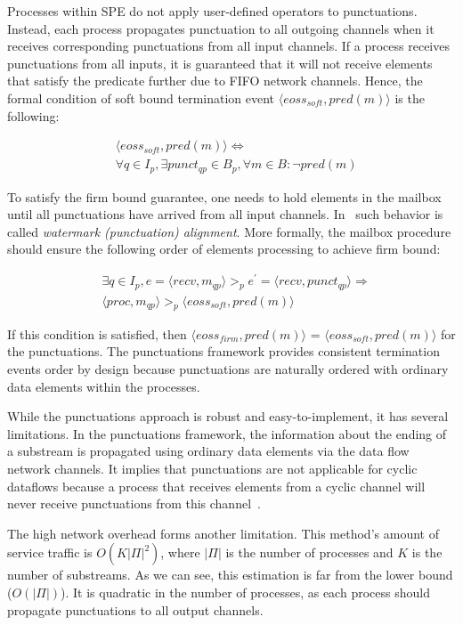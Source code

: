 Processes within SPE do not apply user-defined operators to punctuations. Instead, each process propagates punctuation to all outgoing channels when it receives corresponding punctuations from all input channels. If a process receives punctuations from all inputs, it is guaranteed that it will not receive elements that satisfy the predicate further due to FIFO network channels. Hence, the formal condition of soft bound termination event $\langle eoss_{soft}, pred(m)\rangle$ is the following:

\begin{align*}
& \langle eoss_{soft}, pred(m)\rangle \Longleftrightarrow \\ 
& \forall q \in I_p, \exists punct_{qp} \in B_p, \forall m\in B : \neg pred(m)
\end{align*}

To satisfy the firm bound guarantee, one needs to hold elements in the mailbox until all punctuations have arrived from all input channels. In~\cite{Carbone:2017:SMA:3137765.3137777} such behavior is called {\em watermark (punctuation) alignment}. More formally, the mailbox procedure should ensure the following order of elements processing to achieve firm bound:

\begin{align*}
& \exists q \in I_p, e = \langle recv,m_{qp} \rangle >_p e^{'} = \langle recv,punct_{qp}\rangle \Longrightarrow \\ 
& \langle proc, m_{qp}\rangle >_p \langle eoss_{soft}, pred(m)\rangle
\end{align*}

If this condition is satisfied, then $\langle eoss_{firm}, pred(m)\rangle$ = $\langle eoss_{soft}, pred(m)\rangle$ for the punctuations. The punctuations framework provides consistent termination events order by design because punctuations are naturally ordered with ordinary data elements within the processes.

While the punctuations approach is robust and easy-to-implement, it has several limitations. In the punctuations framework, the information about the ending of a substream is propagated using ordinary data elements via the data flow network channels. It implies that punctuations are not applicable for cyclic dataflows because a process that receives elements from a cyclic channel will never receive punctuations from this channel~\cite{carbone2018scalable}.

The high network overhead forms another limitation. This method's amount of service traffic is $O(K|\Pi|^2)$, where $|\Pi|$ is the number of processes and $K$ is the number of substreams. As we can see, this estimation is far from the lower bound ($O(|\Pi|)$). It is quadratic in the number of processes, as each process should propagate punctuations to all output channels. 

